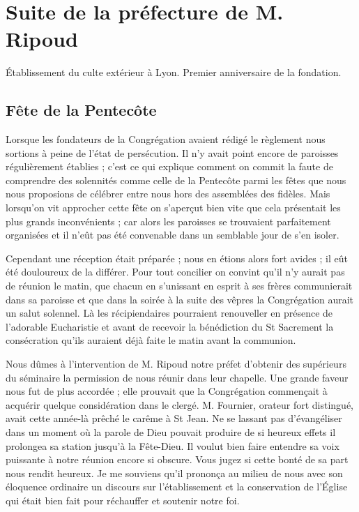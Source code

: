 \chapter{Suite de la préfecture de M. Ripoud}
\begin{center}
Établissement du culte extérieur à Lyon. Premier anniversaire de la fondation.
\end{center}

\section*{Fête de la Pentecôte}
Lorsque les fondateurs de la Congrégation avaient rédigé le règlement nous sortions à peine de l'état de persécution. Il n'y avait point encore de paroisses régulièrement établies ; c'est ce qui explique comment on commit la faute de comprendre des solennités comme celle de la Pentecôte parmi les fêtes que nous nous proposions de célébrer entre nous hors des assemblées des fidèles. Mais lorsqu'on vit approcher cette fête on s'aperçut bien vite que cela présentait les plus grands inconvénients ; car alors les paroisses se trouvaient parfaitement organisées et il n'eût pas été convenable dans un semblable jour de s'en isoler.

Cependant une réception était préparée ; nous en étions alors fort avides ; il eût été douloureux de la différer. Pour
tout concilier on convint qu'il n'y aurait pas de réunion le matin, que chacun en s'unissant en esprit à ses frères communierait dans sa paroisse et que dans la soirée à la suite des vêpres la Congrégation aurait un salut solennel. Là les récipiendaires pourraient renouveller en présence de l'adorable Eucharistie et avant de recevoir la bénédiction du St Sacrement la consécration qu'ils auraient déjà faite le matin avant la communion.

Nous dûmes à l'intervention de M. Ripoud notre préfet d'obtenir des supérieurs du séminaire la permission de nous réunir dans leur chapelle. Une grande faveur nous fut de plus accordée ; elle prouvait que la Congrégation commençait à acquérir quelque considération dans le clergé. M. Fournier, orateur fort distingué, avait cette année-là prêché le carême à St Jean. Ne se lassant pas d'évangéliser dans un moment où la parole de Dieu pouvait produire de si heureux effets il prolongea sa station jusqu'à la Fête-Dieu. Il voulut bien faire entendre sa voix puissante à notre réunion encore si obscure. Vous jugez si cette bonté de sa part nous rendit heureux. Je me souviens qu'il prononça au milieu de nous avec son éloquence ordinaire un discours sur l'établissement et la conservation de l'Église qui était bien fait pour réchauffer et soutenir notre foi.

